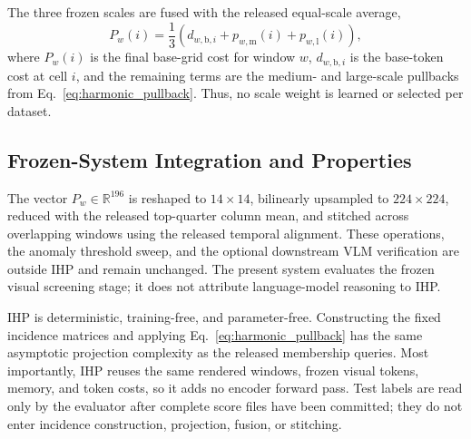The three frozen scales are fused with the released equal-scale average,
\begin{equation}
 P_w(i)=\frac{1}{3}\left(
 d_{w,\mathrm{b},i}+p_{w,\mathrm{m}}(i)+p_{w,\mathrm{l}}(i)
 \right),
 \label{eq:scale_fusion}
\end{equation}
where $P_w(i)$ is the final base-grid cost for window $w$,
$d_{w,\mathrm{b},i}$ is the base-token cost at cell $i$, and the remaining
terms are the medium- and large-scale pullbacks from
Eq.~\eqref{eq:harmonic_pullback}. Thus, no scale weight is learned or selected
per dataset.

\subsection{Frozen-System Integration and Properties}
\label{sec:system_integration}

The vector $P_w\in\mathbb{R}^{196}$ is reshaped to $14\times14$, bilinearly
upsampled to $224\times224$, reduced with the released top-quarter column
mean, and stitched across overlapping windows using the released temporal
alignment. These operations, the anomaly threshold sweep, and the optional
downstream VLM verification are outside IHP and remain unchanged. The present
system evaluates the frozen visual screening stage; it does not attribute
language-model reasoning to IHP.

IHP is deterministic, training-free, and parameter-free. Constructing the
fixed incidence matrices and applying Eq.~\eqref{eq:harmonic_pullback} has the
same asymptotic projection complexity as the released membership queries.
Most importantly, IHP reuses the same rendered windows, frozen visual tokens,
memory, and token costs, so it adds no encoder forward pass. Test labels are
read only by the evaluator after complete score files have been committed;
they do not enter incidence construction, projection, fusion, or stitching.
